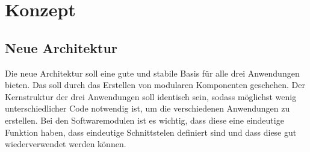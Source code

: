 \chapter{Konzept}

\section{Neue Architektur}
Die neue Architektur soll eine gute und stabile Basis für alle drei Anwendungen bieten. Das soll durch das Erstellen von modularen Komponenten geschehen. Der Kernstruktur der drei Anwendungen soll identisch sein, sodass möglichst wenig unterschiedlicher Code notwendig ist, um die verschiedenen Anwendungen zu erstellen. Bei den Softwaremodulen ist es wichtig, dass diese eine eindeutige Funktion haben, dass eindeutige Schnittstelen definiert sind und dass diese gut wiederverwendet werden können. 


\newpage

\newpage

\newpage




